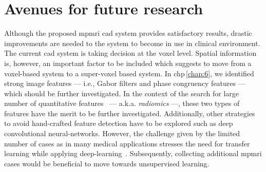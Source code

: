 \section{Avenues for future research}

Although the proposed \ac{mpmri} \ac{cad} system provides satisfactory results, drastic improvements are needed to the system to become in use in clinical environment.
The current \ac{cad} system is taking decision at the voxel level.
Spatial information is, however, an important factor to be included which suggests to move from a voxel-based system to a super-voxel based system.
In \acs{chp}\,\ref{chap:6}, we identified strong image features --- i.e., Gabor filters and phase congruency features --- which should be further investigated.
In the context of the search for large number of quantitative features~\cite{lambin2012radiomics} --- a.k.a. \emph{radiomics} ---, these two types of features have the merit to be further investigated.
Additionally, other strategies to avoid hand-crafted feature detection have to be explored such as deep convolutional neural-networks.
However, the challenge given by the limited number of cases as in many medical applications stresses the need for transfer learning while applying deep-learning~\cite{shin2016deep}.
Subsequently, collecting additional \ac{mpmri} cases would be beneficial to move towards unsupervised learning.